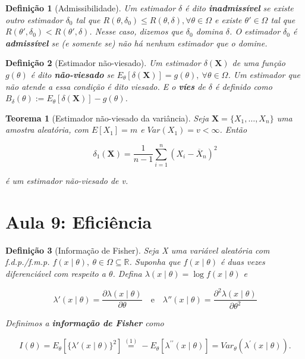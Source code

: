 \documentclass{article}
\newtheorem{theorem}{Teorema}
\newtheorem{definition}{Definição}
\begin{document}
\begin{definition}[Admissibilidade]
Um estimador $\delta$ é dito \textbf{inadmissível} se existe outro estimador $\delta_0$ tal que $R(\theta, \delta_0) \leq R(\theta, \delta), \forall \theta \in \Omega$ e existe $\theta' \in \Omega$ tal que $R(\theta', \delta_0) < R(\theta', \delta)$. Nesse caso, dizemos que $\delta_0$ domina $\delta$. O estimador $\delta_0$ é \textbf{admissível} se (e somente se) não há nenhum estimador que o domine.
\end{definition}

\begin{definition}[Estimador não-viesado]
Um estimador $\delta(\textbf{X})$ de uma função $g(\theta)$ é dito \textbf{não-viesado} se $E_\theta[\delta(\textbf{X})] = g(\theta), \ \forall \theta \in \Omega$. Um estimador que não atende a essa condição é dito viesado. E o \textbf{víes} de $\delta$ é definido como $B_\delta(\theta) := E_\theta[\delta(\textbf{X})] - g(\theta)$.
\end{definition}

\begin{theorem}[Estimador não-viesado da variância]
Seja $\textbf{X} = \{ X_1, \ldots, X_n \}$ uma amostra aleatória, com $E[X_1] = m$ e $Var(X_1) = v < \infty$. Então

$$\delta_1(\textbf{X}) = \frac{1}{n - 1}\sum_{i = 1}^n (X_i - \overline{X}_n)^2$$

é um estimador não-viesado de v.
\end{theorem}

\section*{Aula 9: Eficiência}

\begin{definition}[Informação de Fisher]\label{def:fis}
Seja X uma variável aleatória com f.d.p./f.m.p. $f(x \mid \theta), \ \theta \in \Omega \subseteq \mathbb{R}$. Suponha que $f(x \mid \theta)$ é duas vezes diferenciável com respeito a $\theta$. Defina $\lambda (x \mid \theta) = \log f(x \mid \theta)$ e

\begin{equation}
    \lambda' (x \mid \theta) = \frac{\partial \lambda (x \mid \theta)}{\partial \theta} \quad \mathrm{e} \quad \lambda'' (x \mid \theta) = \frac{\partial^2 \lambda(x \mid \theta)}{\partial \theta^2}
\end{equation}

Definimos a \textbf{informação de Fisher} como

\begin{equation}
    I(\theta) = E_\theta \left [ \{ \lambda'(x \mid \theta) \}^2 \right ] \stackrel{\mathrm{(1)}}{=} -E_\theta\left[\lambda^{\prime\prime}(x \mid \theta)\right] = Var_\theta\left(\lambda^{\prime}(x\mid \theta) \right).
\end{equation}
\end{definition}
\end{document}
